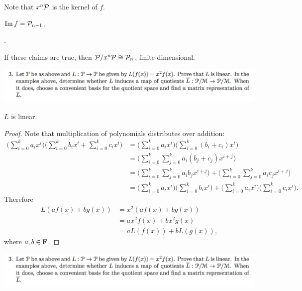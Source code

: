 Note that $x^n\mathcal P$ is the kernel of $f$.

\begin{claim*}
  $\operatorname{\mathrm{Im}} f = \mathcal P_{n-1}$.
\end{claim*}

.

If these claims are true, then $\mathcal P/x^n\mathcal P \cong \mathcal P_n$, finite-dimensional.

\begin{mdframed}
  \includegraphics[width=400pt]{img/linear-algebra-a0-2-3.png}
\end{mdframed}

\begin{claim*}
  $L$ is linear.
\end{claim*}

\begin{proof} Note that multiplication of polynomials distributes over addition:
  \begin{align*}
    \Big(\sum_{i=0}^k a_ix^i\Big)\Big(\sum_{i=0}^k b_ix^i + \sum_{i=0}^k c_ix^i\Big)
    &= \Big(\sum_{i=0}^k a_ix^i\Big)\Big(\sum_{i=0}^k (b_i + c_i)x^i\Big)\\
    &= \Big(\sum_{i=0}^{k}\sum_{j=0}^k a_i(b_j + c_j)x^{i+j}\Big)\\
    &= \Big(\sum_{i=0}^{k}\sum_{j=0}^k a_ib_jx^{i+j}\Big) +
       \Big(\sum_{i=0}^{k}\sum_{j=0}^k a_ic_jx^{i+j}\Big)\\
    &= \Big(\sum_{i=0}^k a_ix^i\Big)\Big(\sum_{i=0}^k b_ix^i\Big) +
       \Big(\sum_{i=0}^k a_ix^i\Big)\Big(\sum_{i=0}^k c_ix^i\Big).
  \end{align*}
  Therefore
  \begin{align*}
    L(af(x) + bg(x)) &= x^2(af(x) + bg(x))\\
                     &= ax^2f(x) + bx^2g(x)\\
                     &= aL(f(x)) + bL(g(x)),
  \end{align*}
  where $a, b \in \mathbf{F}$.
\end{proof}

\newpage
\begin{mdframed}
  \includegraphics[width=400pt]{img/linear-algebra-a0-2-3.png}
\end{mdframed}

